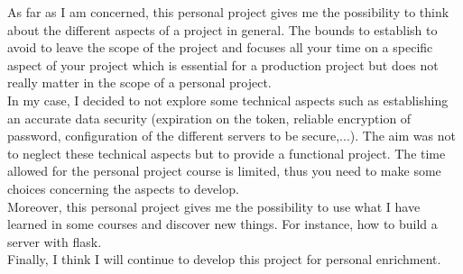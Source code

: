 As far as I am concerned, this personal project gives me the possibility to think about the different aspects of a project in general. The bounds to establish to avoid to leave the scope of the project and focuses all your time on a specific aspect of your project which is essential for a production project but does not really matter in the scope of a personal project.\\

In my case, I decided to not explore some technical aspects such as establishing an accurate data security (expiration on the token, reliable encryption of password, configuration of the different servers to be secure,...). The aim was not to neglect these technical aspects but to provide a functional project. The time allowed for the personal project course is limited, thus you need to make some choices concerning the aspects to develop.\\

Moreover, this personal project gives me the possibility to use what I have learned in some courses and discover new things. For instance, how to build a server with flask.\\

Finally, I think I will continue to develop this project for personal enrichment.